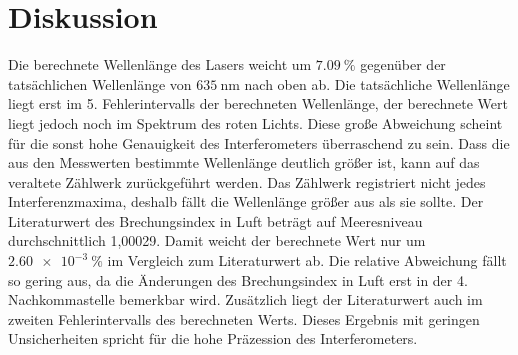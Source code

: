 \section{Diskussion}
\label{sec:Diskussion}

Die berechnete Wellenlänge des Lasers weicht um $\SI{7.09}{\percent}$ gegenüber der tatsächlichen Wellenlänge von $\SI{635}{\nano\meter}$ nach oben ab.
Die tatsächliche Wellenlänge liegt erst im 5. Fehlerintervalls der berechneten Wellenlänge,
der berechnete Wert liegt jedoch noch im Spektrum des roten Lichts.
Diese große Abweichung scheint für die sonst hohe Genauigkeit des Interferometers überraschend zu sein.
Dass die aus den Messwerten bestimmte Wellenlänge deutlich größer ist, kann auf das veraltete Zählwerk zurückgeführt werden.
Das Zählwerk registriert nicht jedes Interferenzmaxima, deshalb fällt die Wellenlänge größer aus als sie sollte.
Der Literaturwert des Brechungsindex in Luft beträgt auf Meeresniveau durchschnittlich 1,00029. \cite{brech}
Damit weicht der berechnete Wert nur um $\SI{2.60e-3}{\percent}$ im Vergleich zum Literaturwert ab.
Die relative Abweichung fällt so gering aus, da die Änderungen des Brechungsindex in Luft erst in der 4. Nachkommastelle bemerkbar wird.
Zusätzlich liegt der Literaturwert auch im zweiten Fehlerintervalls des berechneten Werts.
Dieses Ergebnis mit geringen Unsicherheiten spricht für die hohe Präzession des Interferometers.
